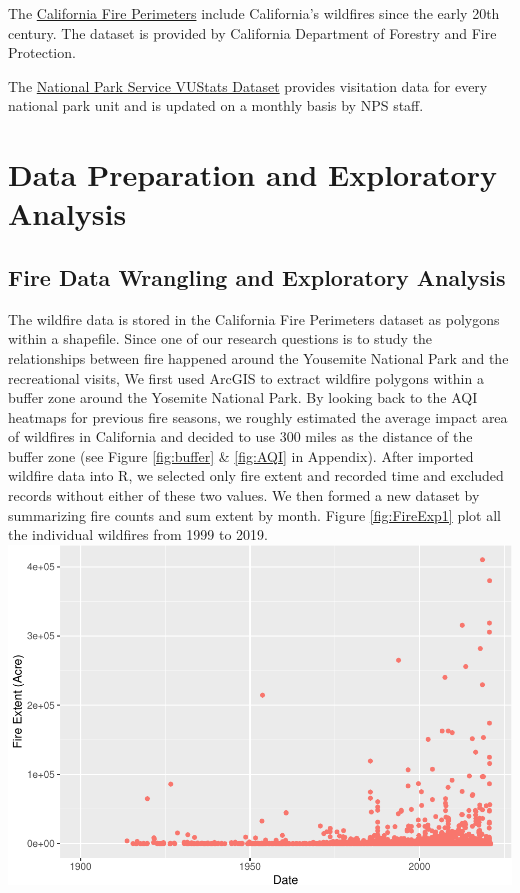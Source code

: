 \documentclass[
  12pt,
]{article}
\begin{document}
The \href{https://gis.data.ca.gov/datasets/CALFIRE-Forestry::california-fire-perimeters-all/explore?location=37.260012\%2C-118.992700\%2C6.00\&showTable=true}{California Fire Perimeters} include California's wildfires since the early 20th century. The dataset is provided by California Department of Forestry and Fire Protection.

The \href{https://irma.nps.gov/STATS/Reports/Park/YOSE}{National Park Service VUStats Dataset} provides visitation data for every national park unit and is updated on a monthly basis by NPS staff.

\hypertarget{data-preparation-and-exploratory-analysis}{%
\section{Data Preparation and Exploratory Analysis}\label{data-preparation-and-exploratory-analysis}}

\hypertarget{fire-data-wrangling-and-exploratory-analysis}{%
\subsection{Fire Data Wrangling and Exploratory Analysis}\label{fire-data-wrangling-and-exploratory-analysis}}

The wildfire data is stored in the California Fire Perimeters dataset as polygons within a shapefile. Since one of our research questions is to study the relationships between fire happened around the Yousemite National Park and the recreational visits, We first used ArcGIS to extract wildfire polygons within a buffer zone around the Yosemite National Park. By looking back to the AQI heatmaps for previous fire seasons, we roughly estimated the average impact area of wildfires in California and decided to use 300 miles as the distance of the buffer zone (see Figure \ref{fig:buffer} \& \ref{fig:AQI} in Appendix).
After imported wildfire data into R, we selected only fire extent and recorded time and excluded records without either of these two values. We then formed a new dataset by summarizing fire counts and sum extent by month.
Figure \ref{fig:FireExp1} plot all the individual wildfires from 1999 to 2019.
\includegraphics{CodeFinal_files/figure-latex/FireExp1-1.pdf}
\end{document}
